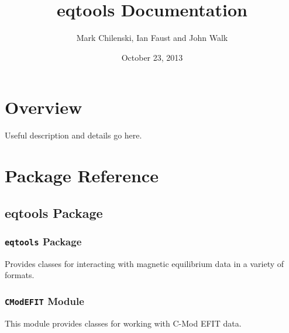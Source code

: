\documentclass[letterpaper,10pt,english]{sphinxmanual}
\title{eqtools Documentation}
\date{October 23, 2013}
\author{Mark Chilenski, Ian Faust and John Walk}
\begin{document}
\maketitle
\tableofcontents
{}\label{index::doc}



\chapter{Overview}
\label{index:overview}\label{index:eqtools-tools-for-interacting-with-magnetic-equilibria}
Useful description and details go here.


\chapter{Package Reference}
\label{index:package-reference}

\section{eqtools Package}
\label{eqtools::doc}\label{eqtools:eqtools-package}

\subsection{\texttt{eqtools} Package}
\label{eqtools:id1}\label{eqtools:module-eqtools.__init__}
Provides classes for interacting with magnetic equilibrium data in a variety of formats.


\subsection{\texttt{CModEFIT} Module}
\label{eqtools:module-eqtools.CModEFIT}\label{eqtools:cmodefit-module}
This module provides classes for working with C-Mod EFIT data.
\end{document}
